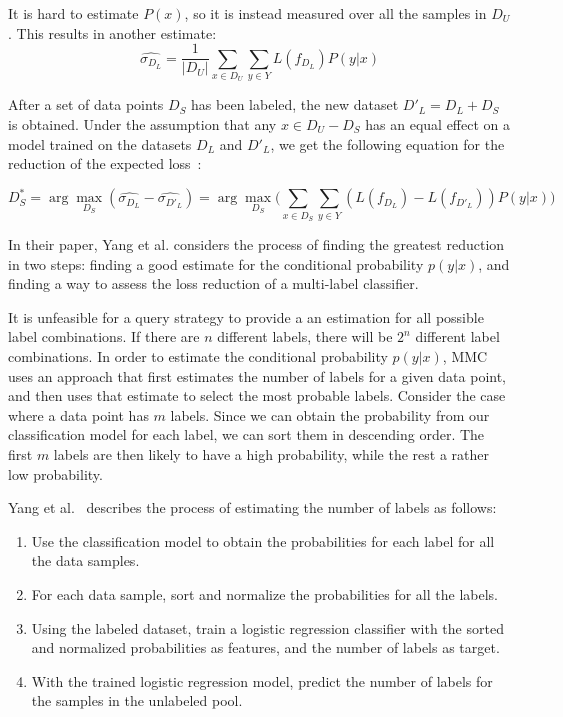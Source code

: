 It is hard to estimate $P(x)$, so it is instead measured over all the samples in $D_U$.
This results in another estimate:
\begin{equation}
    \widehat{\sigma_{D_L}} = \frac{1}{|D_U|} \sum_{x \in D_U} \sum_{y \in Y} L(f_{D_L})P(y|x)
\end{equation}

After a set of data points $D_S$ has been labeled, the new dataset $D'_L=D_L + D_S$ is obtained.
Under the assumption that any $x \in D_U - D_S$ has an equal effect on a model trained on the datasets $D_L$ and $D'_L$, we get the following equation for the reduction of the expected loss~\cite{yang2009effective}:

\begin{equation}
    D^*_S = \arg\max_{D_S}(\widehat{\sigma_{D_L}} - \widehat{\sigma_{D'_L}}) = \arg\max_{D_S} \big ( \sum_{x \in D_S} \sum_{y \in Y} (L(f_{D_L}) - L(f_{D'_L})) P(y|x) \big )
\end{equation}

In their paper, Yang et al\@. considers the process of finding the greatest reduction in two steps: finding a good estimate for the conditional probability $p(y|x)$, and finding a way to assess the loss reduction of a multi-label classifier.

It is unfeasible for a query strategy to provide a an estimation for all possible label combinations.
If there are $n$ different labels, there will be $2^n$ different label combinations.
In order to estimate the conditional probability $p(y|x)$, MMC uses an approach that first estimates the number of labels for a given data point, and then uses that estimate to select the most probable labels.
Consider the case where a data point has $m$ labels.
Since we can obtain the probability from our classification model for each label, we can sort them in descending order.
The first $m$ labels are then likely to have a high probability, while the rest a rather low probability.

Yang et al\@.~\cite{yang2009effective} describes the process of estimating the number of labels as follows:
\begin{enumerate}
    \item Use the classification model to obtain the probabilities for each label for all the data samples.
    \item For each data sample, sort and normalize the probabilities for all the labels.
    \item Using the labeled dataset, train a logistic regression classifier with the sorted and normalized probabilities as features, and the number of labels as target.
    \item With the trained logistic regression model, predict the number of labels for the samples in the unlabeled pool.
\end{enumerate}

